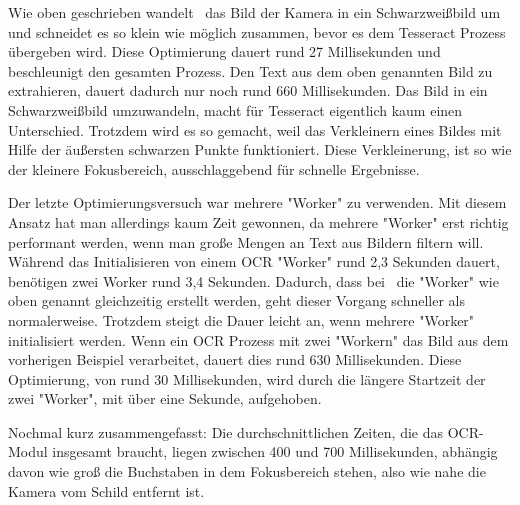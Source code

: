 Wie oben geschrieben wandelt \ZELIA\ das Bild der Kamera in ein Schwarzweißbild um und schneidet es so klein wie möglich zusammen, bevor es dem Tesseract Prozess übergeben wird. Diese Optimierung dauert rund 27 Millisekunden und beschleunigt den gesamten Prozess. Den Text aus dem oben genannten Bild zu extrahieren, dauert dadurch nur noch rund 660 Millisekunden. Das Bild in ein Schwarzweißbild umzuwandeln, macht für Tesseract eigentlich kaum einen Unterschied. Trotzdem wird es so gemacht, weil das Verkleinern eines Bildes mit Hilfe der äußersten schwarzen Punkte funktioniert. Diese Verkleinerung, ist so wie der kleinere Fokusbereich, ausschlaggebend für schnelle Ergebnisse. 

Der letzte Optimierungsversuch war mehrere "Worker" zu verwenden. Mit diesem Ansatz hat man allerdings kaum Zeit gewonnen, da mehrere "Worker" erst richtig performant werden, wenn man große Mengen an Text aus Bildern filtern will. Während das Initialisieren von einem OCR "Worker" rund 2,3 Sekunden dauert, benötigen zwei Worker rund 3,4 Sekunden. Dadurch, dass bei \ZELIA\ die "Worker" wie oben genannt gleichzeitig erstellt werden, geht dieser Vorgang schneller als normalerweise. Trotzdem steigt die Dauer leicht an, wenn mehrere "Worker" initialisiert werden. Wenn ein OCR Prozess mit zwei "Workern" das Bild aus dem vorherigen Beispiel verarbeitet, dauert dies rund 630 Millisekunden. Diese Optimierung, von rund 30 Millisekunden, wird durch die längere Startzeit der zwei "Worker", mit über eine Sekunde, aufgehoben.

Nochmal kurz zusammengefasst: Die durchschnittlichen Zeiten, die das OCR-Modul insgesamt braucht, liegen zwischen 400 und 700 Millisekunden, abhängig davon wie groß die Buchstaben in dem Fokusbereich stehen, also wie nahe die Kamera vom Schild entfernt ist.

